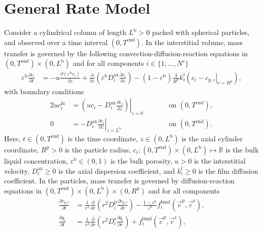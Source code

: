 \documentclass{article}
\begin{document}
\section*{General Rate Model}
Consider a cylindrical column of length $L^{\mathrm{b}} > 0$ packed with spherical particles, and observed over a time interval $(0, T^{\mathrm{end}})$.
In the interstitial volume, mass transfer is governed by the following convection-diffusion-reaction equations in $(0, T^{\mathrm{end}})\times (0, L^{\mathrm{b}})$ and for all components $i\in\{1, \dots, N^{\mathrm{c}} \}$
\begin{align}
    \varepsilon^{\mathrm{b}} \frac{\partial c_{i}}{\partial t}
    &= - u \frac{\partial \left( \varepsilon^{\mathrm{b}} c_{i} \right)}{\partial z}
        + \frac{\partial}{\partial z} \left( \varepsilon^{\mathrm{b}} D^{\mathrm{ax}}_{i} \frac{\partial c_{i}}{\partial z} \right)
        - \left(1 - \varepsilon^{\mathrm{b}} \right) \frac{3}{R^{\mathrm{p}}} k^{\mathrm{f}}_{i} \left(c_{i} - \left. c_{\mathrm{p},i} \right|_{r = R^{\mathrm{p}}} \right),
\end{align}
with boundary conditions
\begin{alignat}{2}
    u c^{\mathrm{in}}_{i}
    &= \left.\left( u c_{i} - D^{\mathrm{ax}}_{i} \frac{\partial c_{i}}{\partial z}\right)\right|_{z=0}
    & & \qquad\text{on }(0, T^{\mathrm{end}}),
    \\
    0
    &= - D^{\mathrm{ax}}_{i} \left. \frac{\partial c_{i}}{\partial z} \right|_{z=L^{\mathrm{b}}}
    & & \qquad\text{on }(0, T^{\mathrm{end}}).
\end{alignat}
Here, $t\in (0, T^{\mathrm{end}})$ is the time coordinate, $z\in (0, L^{\mathrm{b}})$ is the axial cylinder coordinate, $R^{\mathrm{p}}> 0$ is the particle radius, $c_{i}\colon (0, T^{\mathrm{end}})\times (0, L^{\mathrm{b}}) \mapsto \mathbb{R}$ is the bulk liquid concentration, $\varepsilon^{\mathrm{b}}\in (0, 1)$ is the bulk porosity, $u> 0$ is the interstitial velocity, $D^{\mathrm{ax}}_{i}\geq 0$ is the axial dispersion coefficient, and $k^{\mathrm{f}}_{i}\geq 0$ is the film diffusion coefficient.
In the particles, mass transfer is governed by diffusion-reaction equations in $(0, T^{\mathrm{end}}) \times (0, L^{\mathrm{b}})\times (0, R^{\mathrm{p}})$ and for all components
\begin{align}
    \frac{\partial c_{\mathrm{p},i}}{\partial t}
    &= \frac{1}{r^{2}} \frac{\partial }{\partial r} \left( r^{2} D^{\mathrm{p}}_{i} \frac{\partial c_{\mathrm{p},i}}{\partial r} \right)
        - \frac{1 - \varepsilon^{\mathrm{p}}}{\varepsilon^{\mathrm{p}}}f^{\mathrm{bind}}_{i}\left( \vec{c}^{\mathrm{p}}, \vec{c}^{\mathrm{s}} \right),
    \\
    \frac{\partial q_{i}}{\partial t}
    &= \frac{1}{r^{2}} \frac{\partial }{\partial r} \left( r^{2} D^{\mathrm{s}}_{i} \frac{\partial q_{i}}{\partial r} \right)
        + f^{\mathrm{bind}}_{i}\left( \vec{c}^{\mathrm{p}}, \vec{c}^{\mathrm{s}} \right),
\end{align}
\end{document}
